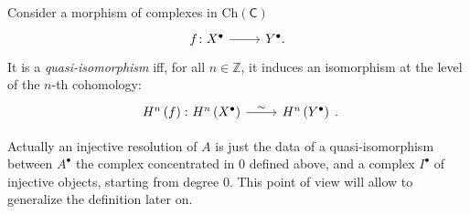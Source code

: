 \documentclass[../Main]{subfiles}
\begin{document}
\begin{defn}
	Consider a morphism of complexes in $\mathrm{Ch}(\mathsf{C})$
	\begin{equation}
	\begin{tikzcd}
		f\colon X^\bullet \arrow[r, "", rightarrow] &
		Y^\bullet.
	\end{tikzcd}
	\end{equation} 
	It is a {\em quasi-isomorphism} iff, for all $n \in \mathbb{Z}$, it induces
	an isomorphism at the level of the $n$-th cohomology:
	\begin{equation}
		\begin{tikzcd}
			H^{n} \left( f \right)\colon H^{n} \left( X^\bullet \right)
			\arrow[r, "\sim", rightarrow] &
			H^{n} \left( Y^\bullet \right)
		\end{tikzcd}
	.\end{equation} 	
\end{defn}
\begin{rem}
	Actually an injective resolution of $A$ is just the data of a quasi-isomorphism
	between $A^\bullet$ the complex concentrated in $0$ defined above, 
	and a complex $I^\bullet$ of injective objects, starting from degree $0$.
	This point of view will allow to generalize the definition later on.
\end{rem}
\end{document}
